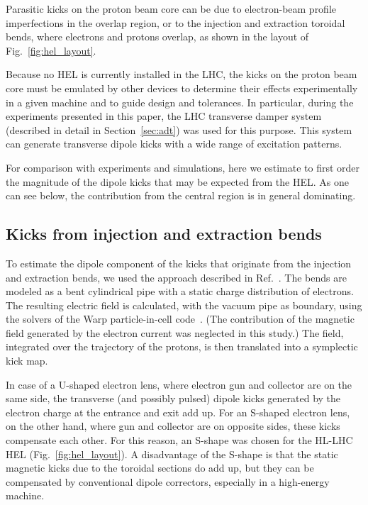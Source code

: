 \documentclass[%
 reprint,
 amsmath,amssymb,
 aps,
prstab,
longbibliography,
]{revtex4-1}
\begin{document}
Parasitic kicks on the proton beam core can be due to electron-beam
profile imperfections in the overlap region, or to the injection and
extraction toroidal bends, where electrons and protons overlap, as
shown in the layout of Fig.~\ref{fig:hel_layout}.

Because no HEL is currently installed in the LHC, the kicks on the
proton beam core must be emulated by other devices to determine their
effects experimentally in a given machine and to guide design and
tolerances. In particular, during the experiments presented in this
paper, the LHC transverse damper system (described in detail in
Section~\ref{sec:adt}) was used for this purpose. This system can
generate transverse dipole kicks with a wide range of excitation
patterns.

For comparison with experiments and simulations, here we estimate to
first order the magnitude of the dipole kicks that may be expected
from the HEL. As one can see below, the contribution from the central
region is in general dominating.


\subsection{Kicks from injection and extraction bends}
\label{core:sec:1}

To estimate the dipole component of the kicks that originate from the
injection and extraction bends, we used the approach described in
Ref.~\cite{hel_bends_stancari}. The bends are modeled as a bent
cylindrical pipe with a static charge distribution of electrons. The
resulting electric field is calculated, with the vacuum pipe as
boundary, using the solvers of the Warp particle-in-cell
code~\cite{warp}. (The contribution of the magnetic field generated by
the electron current was neglected in this study.) The field,
integrated over the trajectory of the protons, is then translated into
a symplectic kick map.

In case of a U-shaped electron lens, where electron gun and collector
are on the same side, the transverse (and possibly pulsed) dipole
kicks generated by the electron charge at the entrance and exit add
up. For an S-shaped electron lens, on the other hand, where gun and
collector are on opposite sides, these kicks compensate each
other. For this reason, an S-shape was chosen for the HL-LHC HEL
(Fig.~\ref{fig:hel_layout}). A disadvantage of the S-shape is that the
static magnetic kicks due to the toroidal sections do add up, but they
can be compensated by conventional dipole correctors, especially in a
high-energy machine.
\end{document}
